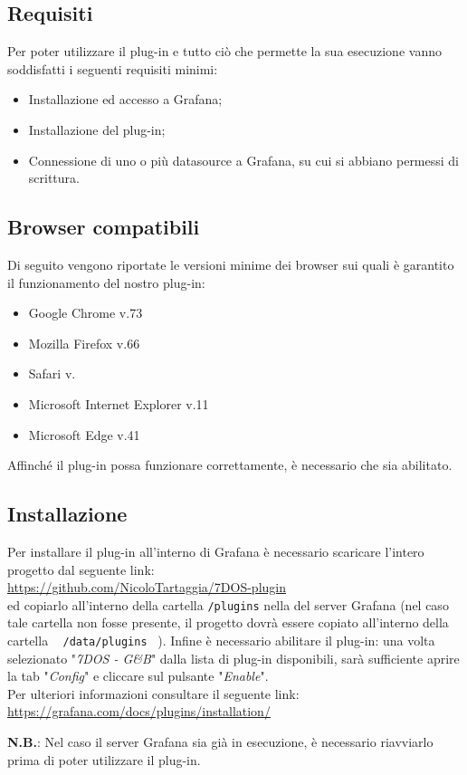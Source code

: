 \subsection{Requisiti}
Per poter utilizzare il plug-in e tutto ciò che permette la sua esecuzione vanno soddisfatti i seguenti requisiti minimi:
\begin{itemize}
	\item{Installazione ed accesso a Grafana;}
	\item{Installazione del plug-in;}
	\item{Connessione di uno o più datasource a Grafana, su cui si abbiano permessi di scrittura.}
\end{itemize}
\subsection{Browser compatibili}
Di seguito vengono riportate le versioni minime dei browser sui quali è garantito il funzionamento del nostro plug-in:
\begin{itemize}
	\item{Google Chrome v.73}
	\item{Mozilla Firefox v.66}
	\item{Safari v.}
	\item{Microsoft Internet Explorer v.11}
	\item{Microsoft Edge v.41} \\
\end{itemize}
Affinché il plug-in possa funzionare correttamente, è necessario che  sia abilitato.
\subsection{Installazione}
Per installare il plug-in all'interno di Grafana è necessario scaricare l'intero progetto dal seguente link: \\[0.2cm]
\hspace*{10mm}\url{https://github.com/NicoloTartaggia/7DOS-plugin}\\[0.2cm]
ed copiarlo all'interno della cartella \texttt{/plugins} nella  del server Grafana (nel caso tale cartella non fosse presente, il progetto dovrà essere copiato all'interno della cartella ~ \texttt{/data/plugins} ~).
Infine è necessario abilitare il plug-in: una volta selezionato "\textit{7DOS - G\&B}" dalla lista di plug-in disponibili, sarà sufficiente aprire la tab "\textit{Config}" e cliccare sul pulsante "\textit{Enable}".\\
Per ulteriori informazioni consultare il seguente link:\\[0.2cm]
\hspace*{10mm}
\url{https://grafana.com/docs/plugins/installation/}

\textbf{N.B.}: Nel caso il server Grafana sia già in esecuzione, è necessario riavviarlo prima di poter utilizzare il plug-in.
\pagebreak
